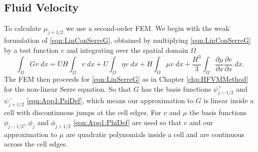 \subsection{Fluid Velocity}
To calculate $\mu_{j+1/2}$ we use a second-order FEM. We begin with the weak formulation of \eqref{eqn:LinConSerreG}, obtained by multiplying \eqref{eqn:LinConSerreG} by a test function $v$ and integrating over the spatial domain $\Omega$
\begin{equation*}
\int_{\Omega}G v \; dx = UH\int_{\Omega} v \; dx + U \int_{\Omega} \eta v \; dx +   H\int_{\Omega} \mu v \; dx  + \frac{H^3}{3} \int_{\Omega} \frac{\partial \mu}{\partial x } \frac{\partial v}{\partial x }\; dx.
\end{equation*}
The FEM then proceeds for \eqref{eqn:LinSerreG} as in Chapter \ref{chp:HFVMMethod} for the non-linear Serre equation. So that $G$ has the basis functions $\psi^+_{j - 1/2}$ and $\psi^-_{j + 1/2}$ \eqref{eqn:App1:PsiDef}, which means our approximation to $G$ is linear inside a cell with discontinuous jumps at the cell edges. For $v$ and $\mu$ the basis functions $\phi_{j-1/2}$, $\phi_{j}$ and $\phi_{j+1/2}$ \eqref{eqn:App1:PhiDef} are used so that $v$ and our approximation to $\mu$ are quadratic polynomials inside a cell and are continuous across the cell edges.

